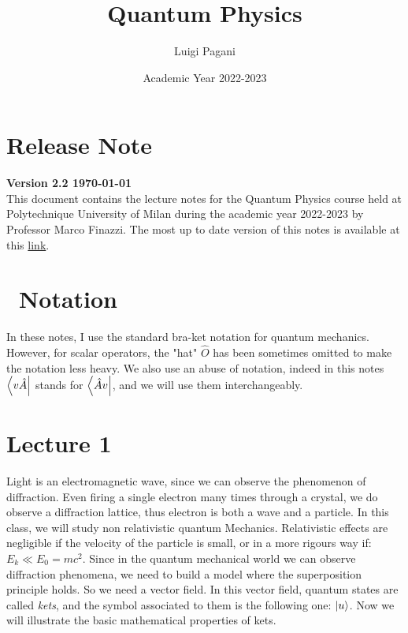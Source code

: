 \documentclass{article}
\title{Quantum Physics}
\author{Luigi Pagani}
\date{Academic Year 2022-2023}
\begin{document}
\maketitle
\noindent 

\section*{Release Note}
\textbf{Version 2.2 \today} \\
This document contains the lecture notes for the Quantum Physics course held at Polytechnique University of Milan during the academic year 2022-2023 by Professor Marco Finazzi. 
The most up to date version of this notes is available at this \href{https://it.overleaf.com/read/wtnwkpkkyzsq}{link}.

\section*{ \danger \  Notation}
In these notes, I use the standard bra-ket notation for quantum mechanics. However, for scalar operators, the "hat" $\hat{O}$ has been sometimes omitted to make the notation less heavy.
We also  use an abuse of notation, indeed in this notes  $\bra{v\hat{A}}$ stands for $\bra{\hat{A}v}$, and we will use them interchangeably. 

\newpage 
\tableofcontents 
\newpage
\section{Lecture 1}

Light is an electromagnetic wave, since we can observe the phenomenon of diffraction.
Even firing a single electron many times through a crystal, we do observe a diffraction lattice, thus electron is both a wave and a particle.
In this class, we will study non relativistic quantum Mechanics. Relativistic effects are negligible if the velocity of the particle is small, or in a more rigours way if: $E_k \ll E_0 = mc^2.$
Since in the quantum mechanical world we can observe diffraction phenomena, we need to build a model where the superposition principle holds. So we need a vector field. In this vector field, quantum states are called \emph{kets}, and the symbol associated to them is the following one: $ \ket{u}$.
Now we will illustrate the basic mathematical properties of kets.
\end{document}
